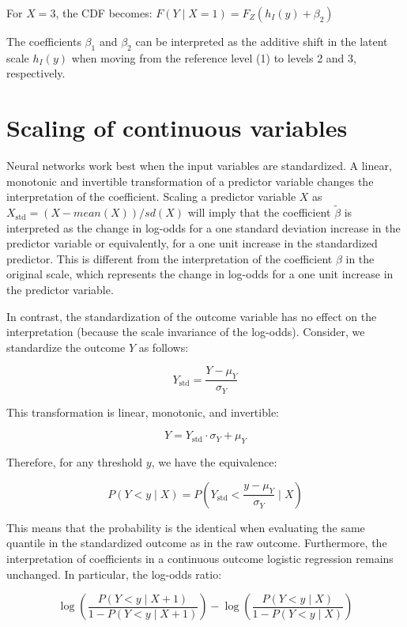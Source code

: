 For $X=3$, the CDF becomes: $F(Y \mid X=1) = F_Z(h_I(y) + \beta_2)$

The coefficients $\beta_1$ and $\beta_2$ can be interpreted as the additive shift in the latent scale $h_I(y)$ when moving from the reference level (1) to levels 2 and 3, respectively.


\section{Scaling of continuous variables} \label{sec:scaling_continuous_variables}

Neural networks work best when the input variables are standardized. A linear, monotonic and invertible transformation of a predictor variable changes the interpretation of the coefficient. Scaling a predictor variable $X$ as $X_{\text{std}} = (X - mean(X)) / sd(X)$ will imply that the coefficient $\tilde{\beta}$ is interpreted as the change in log-odds for a one standard deviation increase in the predictor variable or equivalently, for a one unit increase in the standardized predictor. This is different from the interpretation of the coefficient $\beta$ in the original scale, which represents the change in log-odds for a one unit increase in the predictor variable.




In contrast, the standardization of the outcome variable has no effect on the interpretation (because the scale invariance of the log-odds). Consider, we standardize the outcome \( Y \) as follows:

\[
Y_{\text{std}} = \frac{Y - \mu_Y}{\sigma_Y}
\]

This transformation is linear, monotonic, and invertible:

\[
Y = Y_{\text{std}} \cdot \sigma_Y + \mu_Y
\]

Therefore, for any threshold \( y \), we have the equivalence:

\[
P(Y < y \mid X) = P\left(Y_{\text{std}} < \frac{y - \mu_Y}{\sigma_Y} \mid X\right)
\]

This means that the probability is the identical when evaluating the same quantile in the standardized outcome as in the raw outcome. Furthermore, the interpretation of coefficients in a continuous outcome logistic regression remains unchanged. In particular, the log-odds ratio:

\[
\log \left( \frac{P(Y < y \mid X + 1)}{1 - P(Y < y \mid X + 1)} \right) -
\log \left( \frac{P(Y < y \mid X)}{1 - P(Y < y \mid X)} \right)
\]

